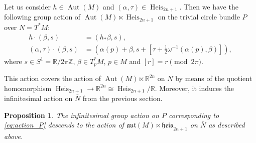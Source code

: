 \documentclass{article}
\newtheorem{proposition}[theorem]{Proposition}
\theoremstyle{definition}
\DeclareMathOperator{\Aut}{Aut}
\DeclareMathOperator{\Heis}{Heis}
\newcommand{\Z}{\mathbb{Z}}
\newcommand{\R}{\mathbb{R}}
\newcommand{\aut}{\mathfrak{aut}}
\newcommand{\heis}{\mathfrak{heis}}
\begin{document}
    Let us consider $h\in\Aut(M)$ and $(\alpha,\tau)\in\Heis_{2n+1}$. Then we have the following group action of $\Aut(M)\ltimes \Heis_{2n+1}$ on the trivial circle bundle $P$ over $N=T^*M$: \begin{equation}\label{eq:action_P}
		\begin{split}
			h\cdot(\beta,s)&=(h_*\beta,s),\\
			(\alpha,\tau)\cdot(\beta,s)&=(\alpha(p)+\beta,s+[\tau+\tfrac{1}{2}\omega^{-1}(\alpha(p),\beta)]),
		\end{split}
	\end{equation} where $s\in S^1=\R/2\pi \Z$, $\beta\in T_p^*M$, $p\in M$ and $[r] = r \pmod{2\pi}$.\medskip

	This action covers the action of $\Aut(M)\ltimes\R^{2n}$ on $N$ by means of the quotient homomorphism $\Heis_{2n+1}\longrightarrow\R^{2n}\cong\Heis_{2n+1}/\R$. Moreover, it induces the infinitesimal action on $\bar N$ from the previous section.
 
    \begin{proposition}\label{prop:inf_group_action}
		The infinitesimal group action on $P$ corresponding to \eqref{eq:action_P} descends to the action of $\aut(M)\ltimes\heis_{2n+1}$ on $\bar N$ as described above.
    \end{proposition}
\end{document}
